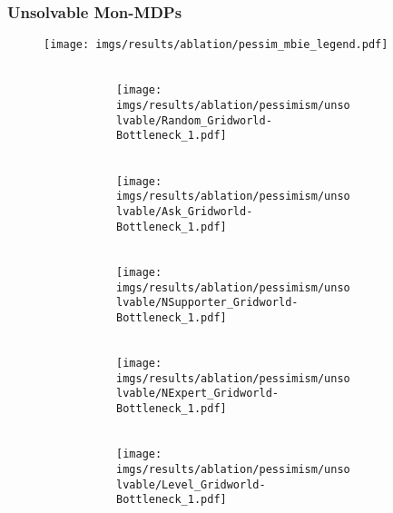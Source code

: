 \subsubsection{Unsolvable Mon-MDPs}
%
%
%
\begin{figure}[!tbh]
    \centering
    \texttt{[image: imgs/results/ablation/pessim\_mbie\_legend.pdf]}
    \\[3pt]
    \begin{subfigure}{\linewidth}
    \hfill
    \begin{subfigure}[b]{0.155\linewidth}
        \centering
        \\
        \texttt{[image: imgs/results/ablation/pessimism/unsolvable/Random\_Gridworld-Bottleneck\_1.pdf]}
    \end{subfigure} 
    \hfill
        \begin{subfigure}[b]{0.155\linewidth}
        \centering
        \\
        \texttt{[image: imgs/results/ablation/pessimism/unsolvable/Ask\_Gridworld-Bottleneck\_1.pdf]}
    \end{subfigure} 
    \hfill
        \begin{subfigure}[b]{0.155\textwidth}
        \centering
        \\
        \texttt{[image: imgs/results/ablation/pessimism/unsolvable/NSupporter\_Gridworld-Bottleneck\_1.pdf]}
    \end{subfigure} 
    \hfill
    \begin{subfigure}[b]{0.155\textwidth}
        \centering
        \\
        \texttt{[image: imgs/results/ablation/pessimism/unsolvable/NExpert\_Gridworld-Bottleneck\_1.pdf]}
    \end{subfigure} 
    \hfill
    \begin{subfigure}[b]{0.155\textwidth}
        \centering
        \\
        \texttt{[image: imgs/results/ablation/pessimism/unsolvable/Level\_Gridworld-Bottleneck\_1.pdf]}

\end{subfigure}
\end{subfigure}
\end{figure}
